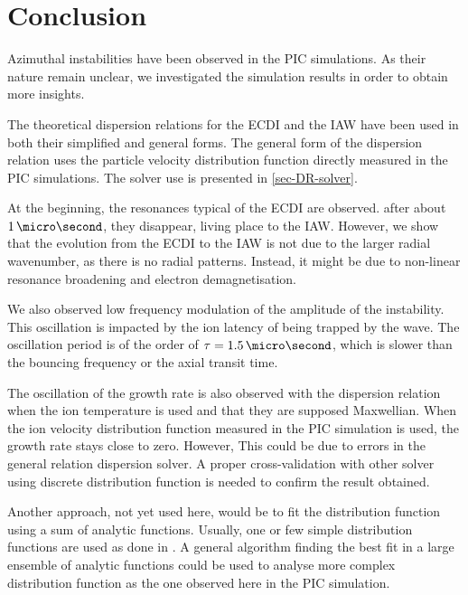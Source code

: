
\section{Conclusion}
  Azimuthal instabilities have been observed in the \ac{PIC} simulations.
  As their nature remain unclear, we investigated the simulation results in order to obtain more insights.
  
  The theoretical dispersion relations for the \ac{ECDI} and the \ac{IAW} have been used in both their simplified and general forms.
  The general form of the dispersion relation uses the particle velocity distribution function directly measured in the \ac{PIC} simulations.
  The solver use is presented in \cref{sec-DR-solver}.
  
  At the beginning, the resonances typical of the \ac{ECDI} are observed.
  after about $1\,\micro\second$, they disappear, living place to the \ac{IAW}.
  However, we show that the evolution from the \ac{ECDI} to the \ac{IAW}  is not due to the larger radial wavenumber, as there is no radial patterns.
  Instead, it might be due to non-linear resonance broadening and electron demagnetisation.
  
  \vspace{1ex}
  We also observed low frequency modulation of the amplitude of the instability.
  This oscillation is impacted by the ion latency of being trapped by the wave.
  The oscillation period is of the order of $\tau=1.5\,\micro\second$, which is slower than the bouncing frequency or the axial transit time.
  
  The oscillation of the growth rate is also observed with the dispersion relation when the ion temperature is used and that they are supposed Maxwellian.
  When the ion velocity distribution function measured in the \ac{PIC}  simulation is used, the growth rate stays close to zero.
  However, This could be due to errors in the general relation dispersion solver.
  A proper cross-validation with other solver using discrete distribution function is needed to confirm the result obtained.
  
  Another approach, not yet used here, would be to fit the distribution function using a sum of analytic functions.
  Usually, one or few simple distribution functions are used as done in \citet{ronnmark1982}.
  A general algorithm finding the best fit in a large ensemble of analytic functions could be used to analyse more complex distribution function as the one observed here in the PIC simulation.
  
